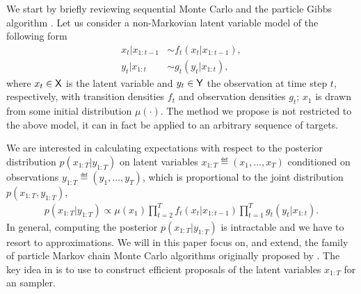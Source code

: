 We start by briefly reviewing sequential Monte Carlo \citep{gordon1993novel,doucet2001sequential} and the particle Gibbs algorithm \citep{andrieuDH2010}. Let us consider a non-Markovian latent variable model of the following form
\begin{subequations}
	\label{eq:ssm}
	\begin{alignat}{2}
	x_t | x_{1:t-1} &\sim f_t(x_t | x_{1:t-1}), \\
	y_t | x_{1:t} &\sim g_t(y_t|x_{1:t}),
	\end{alignat}
\end{subequations}
where $x_t \in \mathsf{X}$ is the latent variable and $y_t \in \mathsf{Y}$ the observation at time step $t$, respectively,
with transition densities $f_t$ and observation densities $g_t$; $x_1$ is drawn from some initial distribution $\mu(\cdot)$. The method we propose is not restricted to the above model, it can in fact be applied to an arbitrary sequence of targets.


We are interested in calculating expectations with respect to the posterior distribution $p(x_{1:T}|y_{1:T})$ on latent variables $x_{1:T} \eqdef (x_1,\ldots,x_T)$ conditioned on observations $y_{1:T} \eqdef (y_1,\ldots,y_T)$, which is proportional to the joint distribution $p(x_{1:T}, y_{1:T})$,
\begin{align}
\label{eq:jointdistribution}
p(x_{1:T} | y_{1:T}) \propto  \mu(x_1) \prod_{t=2}^T f_t(x_t | x_{1:t-1}) \prod_{t=1}^T g_t(y_t|x_{1:t}).\nonumber
\end{align}
In general, computing the posterior $p(x_{1:T}|y_{1:T})$ is intractable and we have to resort to approximations. We will in this paper focus on, and extend, the family of particle Markov chain Monte Carlo algorithms originally proposed by \citet{andrieuDH2010}. The key idea in \pmcmc is to use \smc to construct efficient proposals of the latent variables $x_{1:T}$ for an \mcmc sampler.

